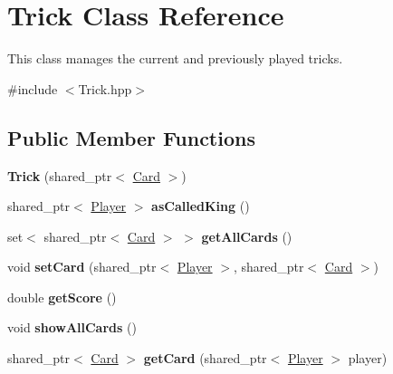 \hypertarget{classTrick}{\section{\-Trick \-Class \-Reference}
\label{classTrick}
}


\-This class manages the current and previously played tricks.  




{\ttfamily \#include $<$\-Trick.\-hpp$>$}

\subsection*{\-Public \-Member \-Functions}
\begin{DoxyCompactItemize}
\item 
\hypertarget{classTrick_a84768e197bf608cb36f9bcfd5b894931}{{\bfseries \-Trick} (shared\-\_\-ptr$<$ \hyperlink{classCard}{\-Card} $>$)}\label{classTrick_a84768e197bf608cb36f9bcfd5b894931}

\item 
\hypertarget{classTrick_a3e98bee722ab6bfcbd659cb34af77202}{shared\-\_\-ptr$<$ \hyperlink{classPlayer}{\-Player} $>$ {\bfseries as\-Called\-King} ()}\label{classTrick_a3e98bee722ab6bfcbd659cb34af77202}

\item 
\hypertarget{classTrick_af77e35811aad04dcbd8b5c5e28a211a1}{set$<$ shared\-\_\-ptr$<$ \hyperlink{classCard}{\-Card} $>$ $>$ {\bfseries get\-All\-Cards} ()}\label{classTrick_af77e35811aad04dcbd8b5c5e28a211a1}

\item 
\hypertarget{classTrick_af1da4b44a0dbfb2eaac4edc5ef0cde85}{void {\bfseries set\-Card} (shared\-\_\-ptr$<$ \hyperlink{classPlayer}{\-Player} $>$, shared\-\_\-ptr$<$ \hyperlink{classCard}{\-Card} $>$)}\label{classTrick_af1da4b44a0dbfb2eaac4edc5ef0cde85}

\item 
\hypertarget{classTrick_ae5b1563e923896a2fe0c5a09113b494b}{double {\bfseries get\-Score} ()}\label{classTrick_ae5b1563e923896a2fe0c5a09113b494b}

\item 
\hypertarget{classTrick_a24eae8424ae5666d362dc0a9e514faa4}{void {\bfseries show\-All\-Cards} ()}\label{classTrick_a24eae8424ae5666d362dc0a9e514faa4}

\item 
\hypertarget{classTrick_a29246478abfaf149e3ba10396e3f1b05}{shared\-\_\-ptr$<$ \hyperlink{classCard}{\-Card} $>$ {\bfseries get\-Card} (shared\-\_\-ptr$<$ \hyperlink{classPlayer}{\-Player} $>$ player)}\label{classTrick_a29246478abfaf149e3ba10396e3f1b05}


\end{DoxyCompactItemize}
